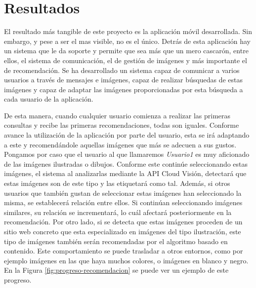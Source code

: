 \chapter{Resultados}
\label{chap:resultados}

El resultado más tangible de este proyecto es la aplicación móvil desarrollada. Sin embargo, y pese a ser el mas visible, no es el único. Detrás de esta aplicación hay un sistema que le da soporte y permite que sea más que un mero cascarón, entre ellos, el sistema de comunicación, el de gestión de imágenes y más importante el de recomendación. Se ha desarrollado un sistema capaz de comunicar a varios usuarios a través de mensajes e imágenes, capaz de realizar búsquedas de estas imágenes y capaz de adaptar las imágenes proporcionadas por esta búsqueda a cada usuario de la aplicación.

De esta manera, cuando cualquier usuario comienza a realizar las primeras consultas y recibe las primeras recomendaciones, todas son iguales. Conforme avance la utilización de la aplicación por parte del usuario, esta se irá adaptando a este y recomendándole aquellas imágenes que más se adecuen a sus gustos. Pongamos por caso que el usuario al que llamaremos \textit{Usuario1} es muy aficionado de las imágenes ilustradas o dibujos. Conforme este continúe seleccionando estas imágenes, el sistema al analizarlas mediante la \ac{API} Cloud Visión, detectará que estas imágenes son de este tipo y las etiquetará como tal. Además, si otros usuarios que también gustan de seleccionar estas imágenes han seleccionado la misma, se establecerá relación entre ellos. Si continúan seleccionando imágenes similares, su relación se incrementará, lo cuál afectará posteriormente en la recomendación. Por otro lado, si se detecta que estas imágenes proceden de un sitio web concreto que esta especializado en imágenes del tipo ilustración, este tipo de imágenes también serán recomendadas por el algoritmo basado en contenido. Este comportamiento se puede trasladar a otros entornos, como por ejemplo imágenes en las que haya muchos colores, o imágenes en blanco y negro. En la Figura \ref{fig:progreso-recomendacion} se puede ver un ejemplo de este progreso.

